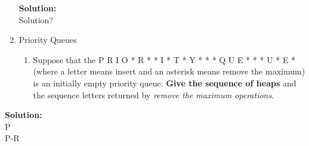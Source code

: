 \documentclass{article}\usepackage{amsmath,amssymb,amsthm,tikz,tkz-graph,color,chngpage,soul,hyperref,csquotes,graphicx,floatrow}\newcommand*{\QEDB}{\hfill\ensuremath{\square}}\newtheorem*{prop}{Proposition}\renewcommand{\theenumi}{\alph{enumi}}\usepackage[shortlabels]{enumitem}\usepackage[nobreak=true]{mdframed}\usetikzlibrary{matrix,calc}\MakeOuterQuote{"}\usepackage[margin=0.75in]{geometry} \newtheorem{theorem}{Theorem}
\begin{document}
\begin{enumerate}[1.]
\begin{mdframed}
\textbf{Solution:} \\
Solution?
\end{mdframed}



\item Priority Queues
\begin{enumerate}[1)]
\item Suppose that the P R I O * R * * I * T * Y * * * Q U E * * * U * E * (where a letter means insert and an asterisk means remove the maximum) is an initially empty priority queue. \textbf{Give the sequence of heaps} and the sequence letters returned by \textit{remove the maximum operations}.
\end{enumerate}

\end{enumerate}

\begin{mdframed}
\textbf{Solution:} \\
P \\
P-R\\

\end{mdframed}
\end{document}
